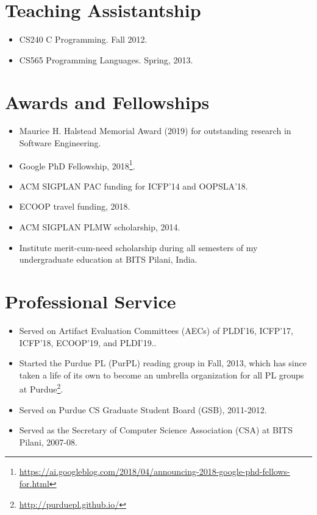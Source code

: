 \documentclass[margin,line]{res}
\begin{document}
\begin{resume}

\section{Teaching Assistantship}
\begin{itemize}
\item CS240 C Programming. Fall 2012.
\item CS565 Programming Languages. Spring, 2013.
\end{itemize}

\section{Awards and Fellowships}
\begin{itemize}
  \item Maurice H. Halstead Memorial Award (2019) for outstanding
    research in Software Engineering.
  \item Google PhD Fellowship, 2018\footnote{\url{https://ai.googleblog.com/2018/04/announcing-2018-google-phd-fellows-for.html}}.
  \item ACM SIGPLAN PAC funding for ICFP'14 and OOPSLA'18.
  \item ECOOP travel funding, 2018.
  \item ACM SIGPLAN PLMW scholarship, 2014.
  \item Institute merit-cum-need scholarship during all semesters of
    my undergraduate education at BITS Pilani, India.
\end{itemize}

\section {Professional Service}
\begin{itemize}
  \item Served on Artifact Evaluation Committees (AECs) of PLDI'16,
    ICFP'17, ICFP'18, ECOOP'19, and PLDI'19.. 
  \item Started the Purdue PL (PurPL) reading group in Fall, 2013,
    which has since taken a life of its own to become an umbrella
    organization for all PL groups at Purdue\footnote{
    \url{http://purduepl.github.io/}}.
  \item Served on Purdue CS Graduate Student Board (GSB), 2011-2012.
  \item Served as the Secretary of Computer Science Association (CSA)
    at BITS Pilani, 2007-08. 
\end{itemize}


\end{resume}
\end{document}
